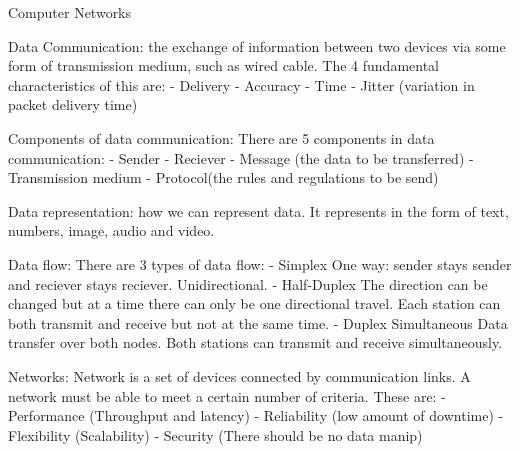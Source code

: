 Computer Networks

Data Communication:
the exchange of information between two devices via some form of transmission medium, such as wired cable. The 4 fundamental characteristics of this are:
- Delivery
- Accuracy
- Time
- Jitter (variation in packet delivery time)

Components of data communication:
There are 5 components in data communication: 
- Sender
- Reciever
- Message (the data to be transferred)
- Transmission medium
- Protocol(the rules and regulations to be send)

Data representation:
how we can represent data. It represents in the form of text, numbers, image, audio and video. 

Data flow:
There are 3 types of data flow: 
- Simplex
 	One way: sender stays sender and reciever stays reciever. 
	Unidirectional. 
- Half-Duplex
	The direction can be changed but at a time there can only be one directional travel.
	Each station can both transmit and receive but not at the  same time. 
- Duplex
	Simultaneous Data transfer over both nodes. 
	Both stations can transmit and receive simultaneously. 

Networks:
Network is a set of devices connected by communication links. A network must be able to meet a certain number of criteria. These are:
- Performance (Throughput and latency)
- Reliability (low amount of downtime)
- Flexibility (Scalability)
- Security    (There should be no data manip)
